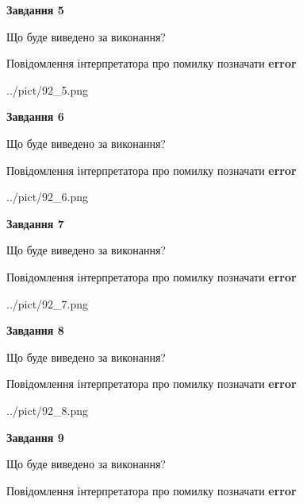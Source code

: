 \documentclass[11pt, ukrainian]{article}
\begin{document}
{\begin {large}
{\begin {center}\textbf{Завдання 5}\end {center}}\par
Що буде виведено за виконання? \par
Повідомлення інтерпретатора про помилку позначати \textbf{error}

\begin{center}
	{../pict/92_5.png}
\end{center}
\newpage

{\begin {center}\textbf{Завдання 6}\end {center}}\par
Що буде виведено за виконання? \par
Повідомлення інтерпретатора про помилку позначати \textbf{error}

\begin{center}
	{../pict/92_6.png}
\end{center}
\newpage

{\begin {center}\textbf{Завдання 7}\end {center}}\par
Що буде виведено за виконання? \par
Повідомлення інтерпретатора про помилку позначати \textbf{error}

\begin{center}
	{../pict/92_7.png}
\end{center}
\newpage

{\begin {center}\textbf{Завдання 8}\end {center}}\par
Що буде виведено за виконання? \par
Повідомлення інтерпретатора про помилку позначати \textbf{error}

\begin{center}
	{../pict/92_8.png}
\end{center}
\newpage

{\begin {center}\textbf{Завдання 9}\end {center}}\par
Що буде виведено за виконання? \par
Повідомлення інтерпретатора про помилку позначати \textbf{error}


\end{large}}
\end{document}
